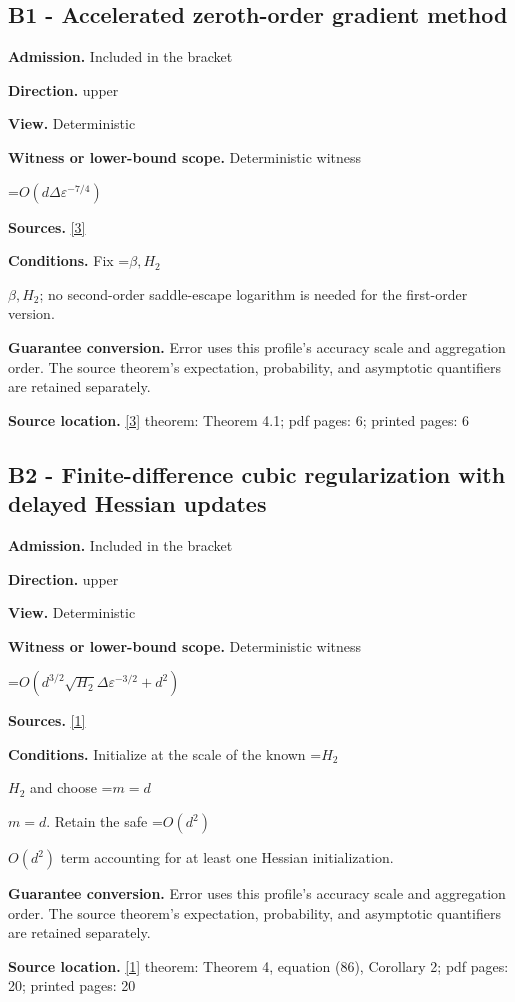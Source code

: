 \documentclass[10pt,a4paper]{article}
\newcommand{\AtlasMath}[1]{\par\begingroup\centering\setbox0=\hbox{$\displaystyle #1$}\ifdim\wd0>1.4\linewidth\typeout{ATLAS WIDE FORMULA: \the\wd0}\fi\ifdim\wd0>\linewidth\resizebox{\linewidth}{!}{\box0}\else\box0\fi\par\endgroup}
\newcommand{\AtlasInlineMath}[1]{\begingroup\setbox0=\hbox{$#1$}\ifdim\wd0>.4\linewidth\endgroup\AtlasMath{#1}\else\endgroup$#1$\fi}
\begin{document}
\subsection{B1 - Accelerated zeroth-order gradient method}
\textbf{Admission.} Included in the bracket

\textbf{Direction.} upper

\textbf{View.} Deterministic

\textbf{Witness or lower-bound scope.} Deterministic witness

\AtlasMath{O(d\Delta\varepsilon^{-7/4})}
\textbf{Sources.} \href{https://proceedings.mlr.press/v235/he24h.html}{[3]}

\textbf{Conditions.} Fix \AtlasInlineMath{\beta,H_2}; no second-order saddle-escape logarithm is needed for the first-order version.

\textbf{Guarantee conversion.} Error uses this profile's accuracy scale and aggregation order. The source theorem's expectation, probability, and asymptotic quantifiers are retained separately.

\textbf{Source location.} \href{https://proceedings.mlr.press/v235/he24h.html}{[3]} theorem: Theorem 4.1; pdf pages: 6; printed pages: 6

\subsection{B2 - Finite-difference cubic regularization with delayed Hessian updates}
\textbf{Admission.} Included in the bracket

\textbf{Direction.} upper

\textbf{View.} Deterministic

\textbf{Witness or lower-bound scope.} Deterministic witness

\AtlasMath{O(d^{3/2}\sqrt{H_2}\Delta\varepsilon^{-3/2}+d^2)}
\textbf{Sources.} \href{https://link.springer.com/article/10.1007/s10915-025-02842-z}{[1]}

\textbf{Conditions.} Initialize at the scale of the known \AtlasInlineMath{H_2} and choose \AtlasInlineMath{m=d}. Retain the safe \AtlasInlineMath{O(d^2)} term accounting for at least one Hessian initialization.

\textbf{Guarantee conversion.} Error uses this profile's accuracy scale and aggregation order. The source theorem's expectation, probability, and asymptotic quantifiers are retained separately.

\textbf{Source location.} \href{https://link.springer.com/article/10.1007/s10915-025-02842-z}{[1]} theorem: Theorem 4, equation (86), Corollary 2; pdf pages: 20; printed pages: 20
\end{document}
